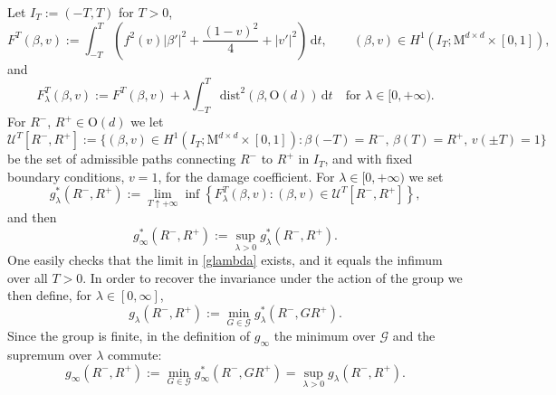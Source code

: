 \documentclass[a4paper,reqno]{amsart}
\newcommand\calU{\mathcal{U}}
\newcommand\dist{{\mathrm{dist}}}
\newcommand\dt{{\,\mathrm{d}t}}
\theoremstyle{remark}
\newcommand{\G}{\mathcal{G}}
\newcommand{\On}{\mathrm{O}(d)}
\newcommand{\Mno}{\mathrm{M}^{d\times d}}
\numberwithin{equation}{section}
\begin{document}
Let $I_T:=(-T,T)$ for $T>0$,
\[
F^T(\beta,v):= \int_{-T}^T \left( f^2(v) |\beta'|^2 + \frac{(1-v)^2}{4} + |v'|^2 \right)\dt, \qquad 
(\beta,v)\in H^1(I_T;\Mno\times [0,1]),
\] 
and
\[
F^T_\lambda(\beta,v):= F^T(\beta,v)+\lambda \int_{-T}^T\dist^2(\beta, \On) \dt \quad \text{for } \lambda\in [0,+\infty).
\]
For $ R^-$, $R^+\in \On$ we let
\begin{equation}\label{eqdefcalUT}
\calU^T[ R^-,R^+]:=  \{  ( \beta,v)  \in  H^1(I_T; \Mno \times [0,1]) \colon
		\beta(-T)= R^-,\, \beta(T)=R^+,\, v(\pm T)=1 \}
\end{equation}
be the set of admissible paths connecting $ R^-$ to $R^+$ in $I_T$, and with fixed boundary conditions, $v=1$, for the damage coefficient.
For $\lambda \in [0,+\infty)$ we set
\begin{equation}\label{glambda}
g^*_\lambda( R^-, R^+):=
		\lim_{T\uparrow +\infty}  \inf\left\{F^T_\lambda(\beta,v)
		\colon (\beta,v)\in \calU^T[ R^-,R^+] \right\},
\end{equation}
and then
\begin{equation}\label{eqdefgstar}
g^*_\infty( R^-, R^+):=\sup_{\lambda>0}
g^*_\lambda( R^-, R^+).
\end{equation}
One easily checks that the limit in \eqref{glambda} exists, and it equals the infimum over all $T>0$.  In order to recover the invariance under the action of the group we then define, for $\lambda\in[0,\infty]$,
\begin{equation}\label{glambdacar}
    g_\lambda( R^-, R^+):=	\min_{G\in\G}g_\lambda^*( R^-, GR^+).
\end{equation}
Since the group is finite, in the definition of $g_\infty$ the minimum over $\G$ and the supremum over $\lambda$ commute:
\begin{equation}\label{glambdainfty}
    g_\infty( R^-, R^+):=	\min_{G\in\G}
    g_\infty^*( R^-, GR^+)
    =\sup_{\lambda>0}
    g_\lambda( R^-, R^+).
\end{equation}
\end{document}

